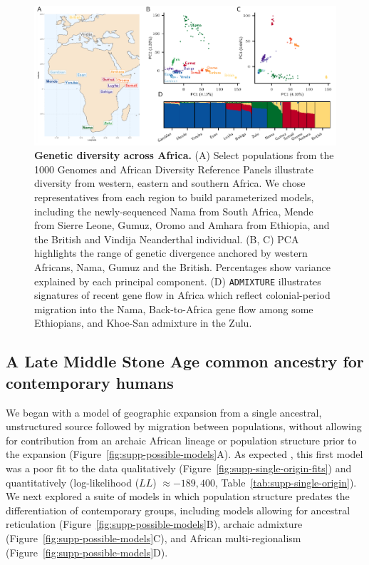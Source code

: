 \documentclass[]{article}
\begin{document}
\begin{figure}[ht!]
    \centering
    \includegraphics{figures/fig1.pdf}
    \caption[width=\textwidth]{
        \textbf{Genetic diversity across Africa.}
        (A) Select populations from the 1000 Genomes and African Diversity Reference Panels
        illustrate diversity from western, eastern and southern Africa.
        We chose representatives from each region to build parameterized models,
        including the newly-sequenced Nama from South Africa, Mende
        from Sierre Leone, Gumuz, Oromo and Amhara from Ethiopia, and the
        British and Vindija Neanderthal individual.
        (B, C) PCA highlights the range of genetic divergence anchored 
        by western Africans, Nama, Gumuz and the British.
        Percentages show variance explained by each principal component.
        (D) \texttt{ADMIXTURE} illustrates signatures of recent gene flow in Africa
        which reflect colonial-period migration into the Nama,
        Back-to-Africa gene flow among some Ethiopians, and Khoe-San admixture in the Zulu.
    }
    \label{fig:1}
\end{figure}
   
\subsection*{A Late Middle Stone Age common ancestry for contemporary humans}

We began with a model of geographic expansion from a single ancestral,
unstructured source followed by migration between populations, without allowing
for contribution from an archaic African lineage or population structure prior
to the expansion (Figure~\ref{fig:supp-possible-models}A). As expected
\citep{Ragsdale2019-nt}, this first model was a poor fit to the data
qualitatively (Figure~\ref{fig:supp-single-origin-fits}) and quantitatively
(log-likelihood ($LL$) $\approx -189,400$, Table~\ref{tab:supp-single-origin}).
We next explored a suite of models in which population structure predates the
differentiation of contemporary groups, including models allowing for ancestral
reticulation (Figure~\ref{fig:supp-possible-models}B), archaic admixture
(Figure~\ref{fig:supp-possible-models}C), and African multi-regionalism
(Figure~\ref{fig:supp-possible-models}D).
\end{document}
